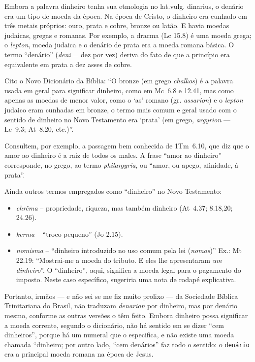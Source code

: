 Embora a palavra dinheiro tenha sua etmologia no lat.vulg. dinarius, o
denário era um tipo de moeda da época. Na época de Cristo, o dinheiro
era cunhado em três metais próprios: ouro, prata e cobre, bronze ou
latão. E havia moedas judaicas, gregas e romanas. Por exemplo, a
dracma (Lc 15.8) é uma moeda grega; o \emph{lepton}, moeda judaica e o
denário de prata era a moeda romana básica. O termo ``denário''
(\emph{deni} = dez por vez) deriva do fato de que a princípio era
equivalente em prata a dez asses de cobre.

Cito o Novo Dicionário da Bíblia: ``O bronze (em grego \emph{chalkos})
é a palavra usada em geral para significar dinheiro, como em Mc~6.8 e
12.41, mas como apenas as moedas de menor valor, como o `as' romano
(gr. \emph{assarion}) e o \emph{lepton} judaico eram cunhadas em
bronze, o termo mais comum e geral usado com o sentido de dinheiro no
Novo Testamento era `prata' (em grego, \emph{argyrion} --- Lc~9.3;
At~8.20, etc.)''.

Consultem, por exemplo, a passagem bem conhecida de 1Tm~6.10, que diz que o amor ao dinheiro é a raiz de todos os males. A frase ``amor ao dinheiro'' corresponde, no grego, ao termo \emph{philargyria}, ou ``amor, ou apego, afinidade, à prata''.

Ainda outros termos empregados como ``dinheiro'' no Novo Testamento:
\begin{itemize}
\item \emph{chr\~ema} -- propriedade, riqueza, mas também dinheiro (At~4.37; 8.18,20; 24.26).
\item \emph{kerma} -- ``troco pequeno'' (Jo 2.15).
\item \emph{nomisma} -- ``dinheiro introduzido no uso comum pela lei
 (\emph{nomos})'' Ex.: Mt 22.19: ``Mostrai-me a moeda do tributo. E
 eles lhe apresentaram \emph{um dinheiro}''. O ``dinheiro'', aqui,
 significa a moeda legal para o pagamento do imposto. Neste caso
 específico, sugeriria uma nota de rodapé explicativa.
\end{itemize}

Portanto, irmãos --- e não sei se me fiz muito prolixo --- da
Sociedade Bíblica Trinitariana do Brasil, não traduzam \emph{denarion}
por dinheiro, mas por denário mesmo, conforme as outras versões o têm
feito. Embora dinheiro possa significar a moeda corrente, segundo o
dicionário, não há sentido em se dizer ``cem dinheiros'', porque há um
numeral que o especifica, e não existe uma moeda chamada ``dinheiro; por outro lado, ``cem denários'' faz todo o sentido: o \texttt{denário} era a principal moeda romana na época de Jesus.


